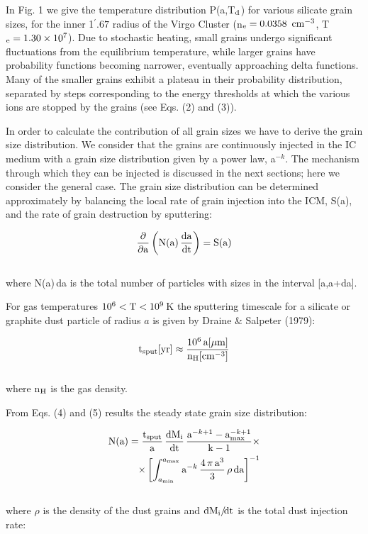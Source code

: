 \documentclass[]{aa}
\begin{document}
In Fig. 1 we give the temperature distribution P(a,T$_{\rm d}$) for various
silicate grain sizes, for the inner 
1$^{\prime}.67$ radius of 
the Virgo Cluster (n$_{\rm e}=0.0358$ ${\rm cm}^{-3}$, 
T$_{\rm e}=1.30\times 10^7$).
Due to stochastic heating, small grains undergo significant 
fluctuations from the equilibrium temperature, while larger grains have
probability functions becoming narrower, eventually approaching delta 
functions. Many of the smaller grains exhibit a plateau in their probability
distribution, separated by steps corresponding to the energy thresholds at
which the various ions are stopped by the grains (see Eqs. (2) and (3)). 

In order to calculate the contribution of all grain sizes we have to derive the
grain size distribution. We consider that the grains are continuously
injected in the IC medium with a grain size distribution given by a power law,
a$^{-k}$.  
The mechanism through which they can be injected is
discussed in the next sections; here we consider the general case. The
grain size distribution can be determined approximately by balancing the local
rate of grain injection into the ICM, S(a), and the rate of grain 
destruction by sputtering:

\begin{eqnarray}
\frac{\partial}{\partial {\rm a}} \left ({\rm N}({\rm a})\, \frac{{\rm da}}{{\rm dt}} 
\right) = {\rm S}({\rm a})
\end{eqnarray}
\\
where N(a)\,da is the total number of particles with sizes in the interval 
[a,a+da].

For gas temperatures $10^6 < {\rm T} < 10^9$\,K the sputtering timescale for a
silicate or graphite dust particle of radius $a$ is given by Draine \& 
Salpeter (1979):

\begin{eqnarray}
 {\rm t}_{\rm sput}[{\rm yr}] \approx \frac{10^6\,{\rm a}[{\mu}{\rm m}]}
{{\rm n}_{\rm H}[{\rm cm}^{-3}]}
\end{eqnarray}
\\
where n$_{\rm H}$ is the gas density.

From Eqs. (4) and (5) results the steady state grain size distribution:

\begin{eqnarray}
{\rm N}({\rm a}) = \frac{{\rm t}_{\rm sput}}{\rm a}\,
\frac{{\rm dM}_{\rm i}}{{\rm dt}}\,
\frac{{\rm a}^{-k+1} - {\rm a}_{\rm max}^{-k+1}}{{\rm k-1}} \times \\ \nonumber
\times \left [ \int_{a_{\rm min}}^{a_{\rm max}} {\rm a}^{-k}\,
\frac{4\,{\pi}\,{\rm a}^3}{3}\,{\rho}\,{\rm da} \right ] ^{-1}
\end{eqnarray}
\\
where ${\rho}$ is the density of the 
dust grains and ${\rm dM}_{\rm i}/\!{\rm dt}$ is the total dust injection
rate:
\end{document}

